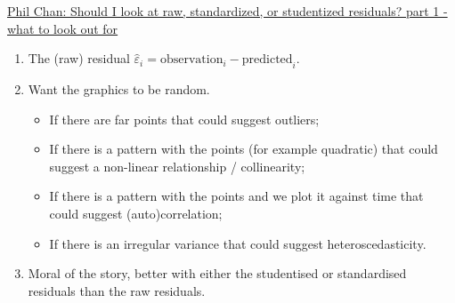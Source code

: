 \documentclass[12pt, titlepage, french]{report}
\begin{document}
\begin{YTB_SUMM}{\href{https://www.youtube.com/watch?v=UyAa5iwJ7m0&list=PLe0nS0mZ7vGGhYcDPNSVNu9gT3wGHbjhu&index=3}{Phil Chan: Should I look at raw, standardized, or studentized residuals? part 1 - what to look out for}}
\begin{enumerate}
	\item	The (raw) residual $\hat\varepsilon_{i} = \text{observation}_{i} - \text{predicted}_{i}$.
	\item	Want the graphics to be random.
	\begin{itemize}
		\item	If there are far points that could suggest outliers;
		\item	If there is a pattern with the points (for example quadratic) that could suggest a non-linear relationship / collinearity;
		\item	If there is a pattern with the points and we plot it against time that could suggest (auto)correlation;
		\item	If there is an irregular variance that could suggest heteroscedasticity.
	\end{itemize}
	\item	Moral of the story, better with either the studentised or standardised residuals than the raw residuals.
\end{enumerate}
\end{YTB_SUMM}
\end{document}
